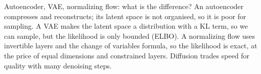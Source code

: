\begin{qabox}[Klambauer]{\pred Autoencoder, VAE, normalizing flow: what is the difference?}
\ans An autoencoder compresses and reconstructs; its latent space is not organised, so it is poor
for sampling. A VAE makes the latent space a distribution with a KL term, so we can sample, but the
likelihood is only bounded (ELBO). A normalizing flow uses invertible layers and the change of
variables formula, so the likelihood is exact, at the price of equal dimensions and constrained
layers. Diffusion trades speed for quality with many denoising steps.
\end{qabox}
